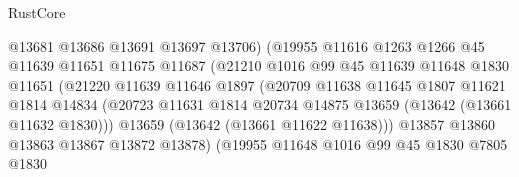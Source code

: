 \begin{lexlean}{RustCore}
\begin{coremodule}
                                    @13681
                                    @13686
                                    @13691
                                    @13697
                                    @13706)
                                  (@19955
                                    @11616
                                    @1263
                                    @1266
                                    @45
                                    @11639
                                    @11651
                                    @11675
                                    @11687
                                    (@21210
                                      @1016
                                      @99
                                      @45
                                      @11639
                                      @11648
                                      @1830
                                      @11651
                                      (@21220
                                        @11639
                                        @11646
                                        @1897
                                        (@20709
                                          @11638
                                          @11645
                                          @1807
                                          @11621
                                          @1814
                                          @14834
                                          (@20723
                                            @11631
                                            @1814
                                            @20734
                                            @14875
                                            @13659
                                            (@13642 (@13661 @11632 @1830)))
                                          @13659
                                          (@13642 (@13661 @11622 @11638)))
                                        @13857
                                        @13860
                                        @13863
                                        @13867
                                        @13872
                                        @13878)
                                      (@19955
                                        @11648
                                        @1016
                                        @99
                                        @45
                                        @1830
                                        @7805
                                        @1830

\end{coremodule}
\end{lexlean}
